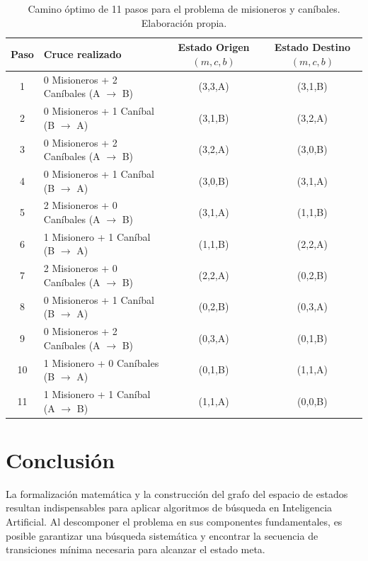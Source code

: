 \documentclass[11pt,letterpaper]{article}
\begin{document}
\begin{table}[ht]
\centering\small
\renewcommand{\arraystretch}{1.15}
\begin{tabular}{@{}clcc@{}}
\toprule
\textbf{Paso} & \textbf{Cruce realizado} & \textbf{Estado Origen $(m,c,b)$} & \textbf{Estado Destino $(m,c,b)$} \\
\midrule
1 & 0 Misioneros + 2 Caníbales (A $\to$ B) & (3,3,A) & (3,1,B) \\
2 & 0 Misioneros + 1 Caníbal (B $\to$ A) & (3,1,B) & (3,2,A) \\
3 & 0 Misioneros + 2 Caníbales (A $\to$ B) & (3,2,A) & (3,0,B) \\
4 & 0 Misioneros + 1 Caníbal (B $\to$ A) & (3,0,B) & (3,1,A) \\
5 & 2 Misioneros + 0 Caníbales (A $\to$ B) & (3,1,A) & (1,1,B) \\
6 & 1 Misionero + 1 Caníbal (B $\to$ A) & (1,1,B) & (2,2,A) \\
7 & 2 Misioneros + 0 Caníbales (A $\to$ B) & (2,2,A) & (0,2,B) \\
8 & 0 Misioneros + 1 Caníbal (B $\to$ A) & (0,2,B) & (0,3,A) \\
9 & 0 Misioneros + 2 Caníbales (A $\to$ B) & (0,3,A) & (0,1,B) \\
10 & 1 Misionero + 0 Caníbales (B $\to$ A) & (0,1,B) & (1,1,A) \\
11 & 1 Misionero + 1 Caníbal (A $\to$ B) & (1,1,A) & (0,0,B) \\
\bottomrule
\end{tabular}
\caption{Camino óptimo de 11 pasos para el problema de misioneros y caníbales. Elaboración propia.}
\label{tab:misioneros}
\end{table}

\section{Conclusión}
La formalización matemática y la construcción del grafo del espacio de estados resultan indispensables para aplicar algoritmos de búsqueda en Inteligencia Artificial. Al descomponer el problema en sus componentes fundamentales, es posible garantizar una búsqueda sistemática y encontrar la secuencia de transiciones mínima necesaria para alcanzar el estado meta.

\end{document}
